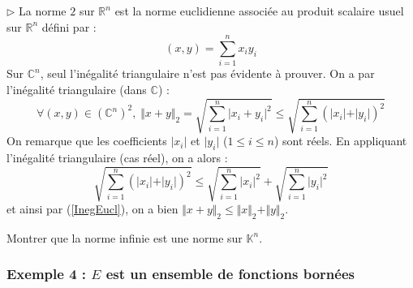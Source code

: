 \documentclass[french,11pt,twoside]{VcCours}
\begin{document}
\begin{Demonstration}{}
$\rhd$ La norme $2$ sur $\mathbb{R}^n$ est la norme euclidienne associée au produit scalaire usuel sur $\mathbb{R}^n$ défini par :
$$ (x,y) = \sum_{i=1}^n x_i y_i $$
Sur $\mathbb{C}^n$, seul l'inégalité triangulaire n'est pas évidente à prouver. On a par l'inégalité triangulaire (dans $\mathbb{C}$) :
\begin{equation}\label{InegEucl} \forall (x,y) \in (\mathbb{C}^n)^2, \; \Vert x+y \Vert_2 =  \sqrt{\sum_{i=1}^n \vert x_i+y_i \vert^2} \leq \sqrt{\sum_{i=1}^n (\vert x_i \vert + \vert y_i \vert)^2}
\end{equation}
On remarque que les coefficients $\vert x_i \vert$ et $\vert y_i \vert$ ($1 \leq i \leq n$) sont réels. En appliquant l'inégalité triangulaire (cas réel), on a alors :
$$ \sqrt{\sum_{i=1}^n (\vert x_i \vert + \vert y_i \vert)^2} \leq \sqrt{\sum_{i=1}^n \vert x_i \vert^2 } + \sqrt{\sum_{i=1}^n \vert y_i \vert^2 }$$
et ainsi par (\ref{InegEucl}), on a bien $\Vert x + y \Vert_2 \leq \Vert x  \Vert_2 + \Vert  y \Vert_2$.

%
\end{Demonstration}

\begin{ApplicationDirecte}{} Montrer que la norme infinie est une norme sur $\mathbb{K}^n$.
\end{ApplicationDirecte}

\subsubsection{Exemple 4 : \texorpdfstring{$E$}{E} est un ensemble de fonctions bornées}
\end{document}
